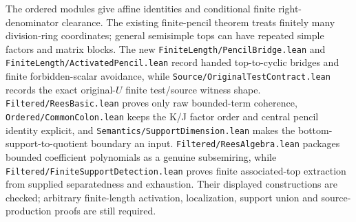 \documentclass[10pt,a4paper]{article}
\newcommand{\lean}[1]{\nolinkurl{#1}}
\begin{document}
The ordered modules give affine identities and conditional finite
right-denominator clearance. The existing finite-pencil theorem treats
finitely many division-ring coordinates; general semisimple tops can have
repeated simple factors and matrix blocks. The new
\lean{FiniteLength/PencilBridge.lean} and
\lean{FiniteLength/ActivatedPencil.lean} record handed top-to-cyclic bridges
and finite forbidden-scalar avoidance, while
\lean{Source/OriginalTestContract.lean} records the exact original-\(U\) finite
test/source witness shape. \lean{Filtered/ReesBasic.lean} proves only raw
bounded-term coherence, \lean{Ordered/CommonColon.lean} keeps the K/J factor
order and central pencil identity explicit, and
\lean{Semantics/SupportDimension.lean} makes the bottom-support-to-quotient
boundary an input. \lean{Filtered/ReesAlgebra.lean} packages bounded
coefficient polynomials as a genuine subsemiring, while
\lean{Filtered/FiniteSupportDetection.lean} proves finite associated-top
extraction from supplied separatedness and exhaustion. Their displayed
constructions are checked; arbitrary finite-length
activation, localization, support union and source-production proofs are still
required.
\end{document}
